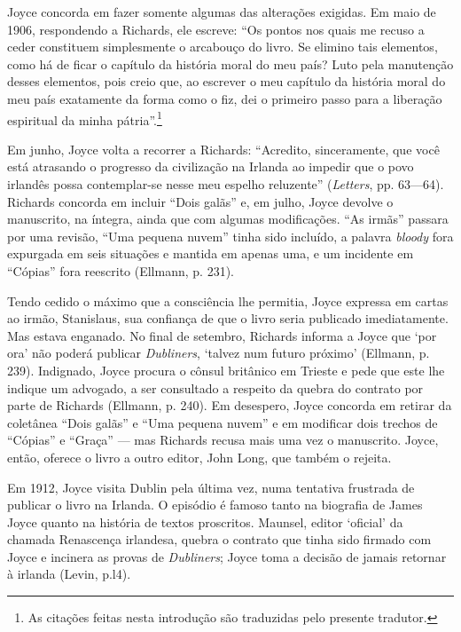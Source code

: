 Joyce concorda em fazer somente algumas das alterações exigidas. Em
maio de 1906, respondendo a Richards, ele escreve: ``Os pontos nos
quais me recuso a ceder constituem simplesmente o arcabouço do livro.
Se elimino tais elementos, como há de ficar o capítulo da história
moral do meu país? Luto pela manutenção desses elementos, pois creio
que, ao escrever o meu capítulo da história moral do meu país
exatamente da forma como o fiz, dei o primeiro passo para a liberação
espiritual da minha pátria''.\footnote{ As citações feitas nesta
introdução são traduzidas pelo presente tradutor.}

Em junho, Joyce volta a recorrer a Richards: ``Acredito,
sinceramente, que você está atrasando o progresso da civilização na
Irlanda ao impedir que o povo irlandês possa contemplar-se nesse meu
espelho reluzente'' (\textit{Letters}, pp. 63---64). Richards concorda em
incluir ``Dois galãs'' e, em julho, Joyce devolve o manuscrito, na
íntegra, ainda que com algumas modificações. ``As irmãs'' passara
por uma revisão, ``Uma pequena nuvem'' tinha sido incluído, a
palavra \textit{bloody} fora expurgada em seis situações e mantida em apenas
uma, e um incidente em ``Cópias'' fora reescrito (Ellmann, p.
231).

Tendo cedido o máximo que a consciência lhe permitia, Joyce expressa
em cartas ao irmão, Stanislaus, sua confiança de que o livro seria
publicado imediatamente. Mas estava enganado. No final de setembro,
Richards informa a Joyce que `por ora' não poderá publicar
\textit{Dubliners}, `talvez num futuro próximo' (Ellmann, p. 239).
Indignado, Joyce procura o cônsul britânico em Trieste e pede que
este lhe indique um advogado, a ser consultado a respeito da quebra do
contrato por parte de Richards (Ellmann, p. 240). Em desespero, Joyce
concorda em retirar da coletânea ``Dois galãs'' e ``Uma pequena
nuvem'' e em modificar dois trechos de ``Cópias'' e
``Graça'' --- mas Richards recusa mais uma vez o manuscrito.
Joyce, então, oferece o livro a outro editor, John Long, que também o
rejeita.

Em 1912, Joyce visita Dublin pela última vez, numa tentativa frustrada
de publicar o livro na Irlanda. O episódio é famoso tanto na biografia
de James Joyce quanto na história de textos proscritos. Maunsel,
editor `oficial' da chamada Renascença irlandesa, quebra o contrato
que tinha sido firmado com Joyce e incinera as provas de \textit{Dubliners};
Joyce toma a decisão de jamais retornar à irlanda (Levin, p.l4).

